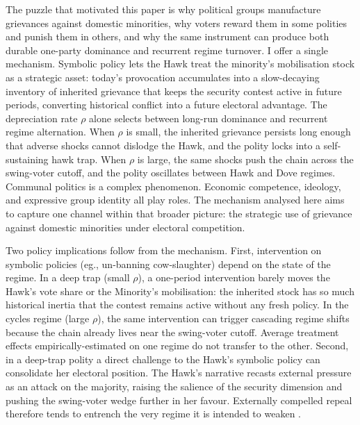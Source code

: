 \documentclass[11pt,twoside]{extarticle}
\begin{document}
The puzzle that motivated this paper is why political groups manufacture grievances against domestic minorities, why voters reward them in some polities and punish them in others, and why the same instrument can produce both durable one-party dominance and recurrent regime turnover. I offer a single mechanism. Symbolic policy lets the Hawk treat the minority's mobilisation stock as a strategic asset: today's provocation accumulates into a slow-decaying inventory of inherited grievance that keeps the security contest active in future periods, converting historical conflict into a future electoral advantage. The depreciation rate $\rho$ alone selects between long-run dominance and recurrent regime alternation. When $\rho$ is small, the inherited grievance persists long enough that adverse shocks cannot dislodge the Hawk, and the polity locks into a self-sustaining hawk trap. When $\rho$ is large, the same shocks push the chain across the swing-voter cutoff, and the polity oscillates between Hawk and Dove regimes. Communal politics is a complex phenomenon. Economic competence, ideology, and expressive group identity all play roles. The mechanism analysed here aims to capture one channel within that broader picture: the strategic use of grievance against domestic minorities under electoral competition.

Two policy implications follow from the mechanism. First, intervention on symbolic policies (eg., un-banning cow-slaughter) depend on the state of the regime. In a deep trap (small $\rho$), a one-period intervention barely moves the Hawk's vote share or the Minority's mobilisation: the inherited stock has so much historical inertia that the contest remains active without any fresh policy. In the cycles regime (large $\rho$), the same intervention can trigger cascading regime shifts because the chain already lives near the swing-voter cutoff. Average treatment effects empirically-estimated on one regime do not transfer to the other. Second, in a deep-trap polity a direct challenge to the Hawk's symbolic policy can consolidate her electoral position. The Hawk's narrative recasts external pressure as an attack on the majority, raising the salience of the security dimension and pushing the swing-voter wedge further in her favour. Externally compelled repeal therefore tends to entrench the very regime it is intended to weaken \citet*{carvalhoResistingEducation2024a}.
\end{document}
